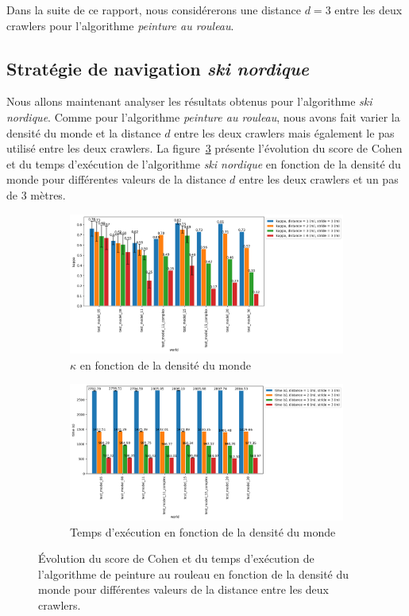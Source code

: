 \documentclass[francais,RandD]{rapportPFE}
\begin{document}
			Dans la suite de ce rapport, nous considérerons une distance $d = 3$ entre les deux crawlers pour l'algorithme \textit{peinture au rouleau}.
		\subsection*{Stratégie de navigation \textit{ski nordique}}
			Nous allons maintenant analyser les résultats obtenus pour l'algorithme \textit{ski nordique}.
			Comme pour l'algorithme \textit{peinture au rouleau}, nous avons fait varier la densité du monde et la distance $d$ entre les deux crawlers mais également le pas utilisé entre les deux crawlers.
			La figure~\ref{fig:ski_nordique-world_d} présente l'évolution du score de Cohen et du temps d'exécution de l'algorithme \textit{ski nordique} en fonction de la densité du monde pour différentes valeurs de la distance $d$ entre les deux crawlers et un pas de 3 mètres.

			\begin{figure}[h!]
				\centering
				\begin{subfigure}[t]{0.9\linewidth}
					\includegraphics[width=\linewidth]{graphics/ski_nordique-kappa_vs_world_for_each_d.png}
					\caption{$\kappa$ en fonction de la densité du monde}
					\label{fig:ski_nordique-kappa_vs_world_d}
				\end{subfigure}
				\hfill
				\begin{subfigure}[t]{0.9\linewidth}
						\includegraphics[width=\linewidth]{graphics/ski_nordique-time_vs_world_for_each_d.png}
						\caption{Temps d'exécution en fonction de la densité du monde}
						\label{fig:ski_nordique-time_vs_world_d}
				\end{subfigure}
				\caption{Évolution du score de Cohen et du temps d'exécution de l'algorithme de peinture au rouleau en fonction de la densité du monde pour différentes valeurs de la distance entre les deux crawlers.}
				\label{fig:ski_nordique-world_d}
			\end{figure}
\end{document}
